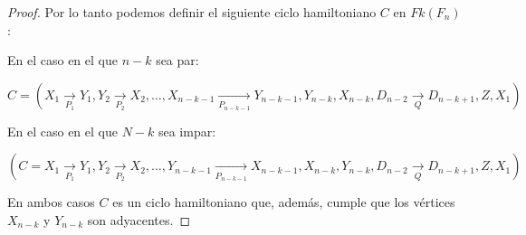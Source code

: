 \begin{proof}
            Por lo tanto podemos definir el siguiente ciclo hamiltoniano $C$ en
            $Fk(F_n)$: 
    
            En el caso en el que $n-k$ sea par:
            
            $C =(X_1 \xrightarrow[P_1]{} Y_1, Y_2 \xrightarrow[P_2]{} X_2,
            \dots, X_{n-k-1} \xrightarrow[P_{n-k-1}]{} Y_{n-k-1}, Y_{n-k},
            X_{n-k}, D_{n-2} \xrightarrow[Q]{} D_{n-k+1}, Z, X_1)$
    
            En el caso en el que $N-k$ sea impar:
    
            $(C =X_1 \xrightarrow[P_1]{} Y_1, Y_2 \xrightarrow[P_2]{} X_2,
            \dots, Y_{n-k-1} \xrightarrow[P_{n-k-1}]{} X_{n-k-1}, X_{n-k},
            Y_{n-k}, D_{n-2} \xrightarrow[Q]{} D_{n-k+1}, Z, X_1)$
    
            En ambos casos $C$ es un ciclo hamiltoniano que, adem\'as, cumple
            que los v\'ertices $X_{n-k}$ y $Y_{n-k}$ son adyacentes. 
    
        \end{proof}